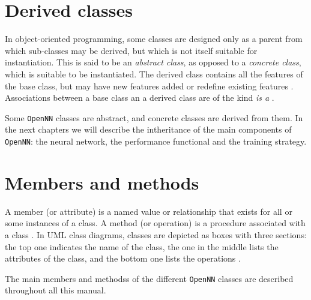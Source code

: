 \section{Derived classes}


In object-oriented programming, some classes are designed only as
a parent from which sub-classes may be derived, but which is not
itself suitable for instantiation. This is said to be an
\textit{abstract class}, as opposed to a \textit{concrete
class}, which
is suitable to be instantiated. The derived class contains all the
features of the base class, but may have new features added or
redefine existing features \cite{Stroustrup2000}. Associations
between a base class an a derived class are of the kind \textit{is
a} \cite{Rumbaugh1999}.


Some \texttt{OpenNN} classes are abstract, and concrete classes are derived from them. 
In the next chapters we will describe the intheritance of the main components 
of \texttt{OpenNN}: the neural network, the performance functional and the training strategy.  

\section{Members and methods} 

A member (or attribute) is a named value or relationship that exists for all or some instances of a class. 
A method (or operation) is a procedure associated with a class \cite{Stroustrup2000}. 
In UML class diagrams, classes are depicted as boxes with three sections: the
top one indicates the name of the class, the one in the middle
lists the attributes of the class, and the bottom one lists the
operations \cite{Rumbaugh1999}.

The main members and methodss of the different \texttt{OpenNN} classes are described throughout all this manual. 
